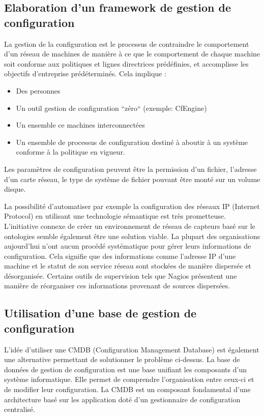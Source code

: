 \subsection{Elaboration d'un framework de gestion de configuration}

La gestion de la configuration est le processus de contraindre le comportement
d'un réseau de machines de manière à ce que le comportement de chaque machine
soit conforme aux politiques et lignes directrices prédéfinies, et
accomplisse les objectifs d'entreprise prédéterminés. Cela implique :

\begin{itemize}
  \item Des personnes
  \item Un outil gestion de configuration ``zéro`` (exemple: CfEngine)
  \item Un ensemble ce machines interconnectées
  \item Un ensemble de processus de configuration destiné à aboutir à un système
	  conforme à la politique en vigueur.
\end{itemize}

Les paramètres de configuration peuvent être la permission d'un fichier,
l'adresse d'un carte réseau, le type de système de fichier pouvant être monté
sur un volume disque.

La possibilité d'automatiser par exemple la configuration des réseaux IP
(Internet Protocol) en utilisant une technologie sémantique est très
prometteuse. L'initiative connexe de créer un environnement de réseau de
capteurs basé sur le ontologies semble également être une solution viable.
La plupart des organisations aujourd'hui n'ont aucun procédé systématique pour
gérer leurs informations de configuration. Cela signifie que des informations
comme l'adresse IP d'une machine et le statut de son service réseau sont
stockées de manière dispersée et désorganisée. Certains outils de supervision
tels que Nagios présentent une manière de réorganiser ces informations provenant
de sources dispersées. 

\subsection{Utilisation d'une base de gestion de configuration}

L'idée d'utiliser une CMDB (Configuration Management Database) est également une
alternative permettant de solutionner le problème ci-dessus. La base de données
de gestion de configuration est une base unifiant les composants d'un système
informatique. Elle permet de comprendre l'organisation entre ceux-ci et de
modifier leur configuration. La CMDB est un composant fondamental d'une
architecture basé sur les application doté d'un gestionnaire de configuration
centralisé. 

